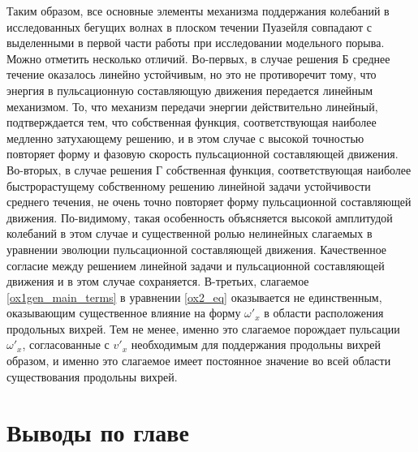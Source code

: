 Таким образом, все основные элементы механизма поддержания колебаний в исследованных бегущих волнах в плоском течении Пуазейля совпадают с выделенными в первой части работы при исследовании модельного порыва. Можно отметить несколько отличий. Во-первых, в случае решения Б среднее течение оказалось линейно устойчивым, но это не противоречит тому, что энергия в пульсационную составляющую движения передается линейным механизмом. То, что механизм передачи энергии действительно линейный, подтверждается тем, что собственная функция, соответствующая наиболее медленно затухающему решению, и в этом случае с высокой точностью повторяет форму и фазовую скорость пульсационной составляющей движения. Во-вторых, в случае решения Г собственная функция, соответствующая наиболее быстрорастущему собственному решению линейной задачи устойчивости среднего течения, не очень точно повторяет форму пульсационной составляющей движения. По-видимому, такая особенность объясняется высокой амплитудой колебаний в этом случае и существенной ролью нелинейных слагаемых в уравнении эволюции пульсационной составляющей движения. Качественное согласие между решением линейной задачи и пульсационной составляющей движения и в этом случае сохраняется. В-третьих, слагаемое \eqref{ox1gen_main_terms} в уравнении \eqref{ox2_eq} оказывается не единственным, оказывающим существенное влияние на форму $\omega'_x$ в области расположения продольных вихрей. Тем не менее, именно это слагаемое порождает пульсации $\omega'_x$, согласованные с $v'_x$ необходимым для поддержания продольны вихрей образом, и именно это слагаемое имеет постоянное значение во всей области существования продольны вихрей. 


\section{Выводы по главе}


